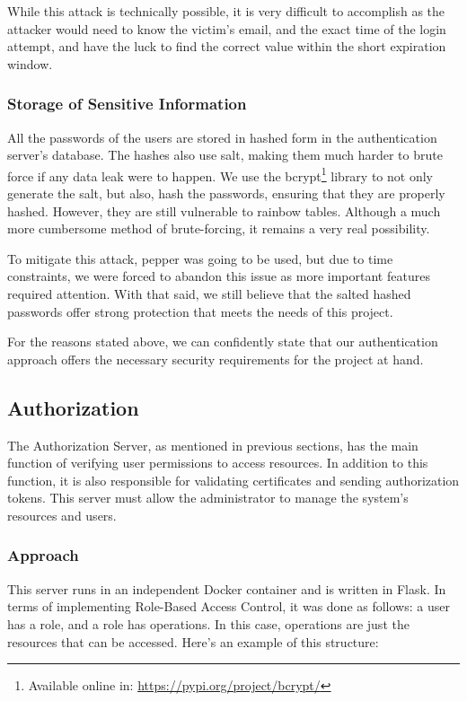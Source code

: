 \documentclass[10pt]{article}
\begin{document}
While this attack is technically possible, it is very difficult to accomplish as the attacker would need to know the victim's email, and the exact time of the login attempt, and have the luck to find the correct value within the short expiration window.

\subsubsection*{Storage of Sensitive Information}

All the passwords of the users are stored in hashed form in the authentication server's database. The hashes also use salt, making them much harder to brute force if any data leak were to happen. We use the bcrypt\footnote{Available online in: \url{https://pypi.org/project/bcrypt/}} library to not only generate the salt, but also, hash the passwords, ensuring that they are properly hashed. However, they are still vulnerable to rainbow tables. Although a much more cumbersome method of brute-forcing, it remains a very real possibility. 

To mitigate this attack, pepper was going to be used, but due to time constraints, we were forced to abandon this issue as more important features required attention. With that said, we still believe that the salted hashed passwords offer strong protection that meets the needs of this project.

\vspace{1em}

For the reasons stated above, we can confidently state that our authentication approach offers the necessary security requirements for the project at hand.

\subsection{Authorization}
The Authorization Server, as mentioned in previous sections, has the main function of verifying user permissions to access resources. In addition to this function, it is also responsible for validating certificates and sending authorization tokens. This server must allow the administrator to manage the system's resources and users.

\subsubsection{Approach}

This server runs in an independent Docker container and is written in Flask.
In terms of implementing Role-Based Access Control, it was done as follows: a user has a role, and a role has operations. In this case, operations are just the resources that can be accessed. Here's an example of this structure:
\end{document}
